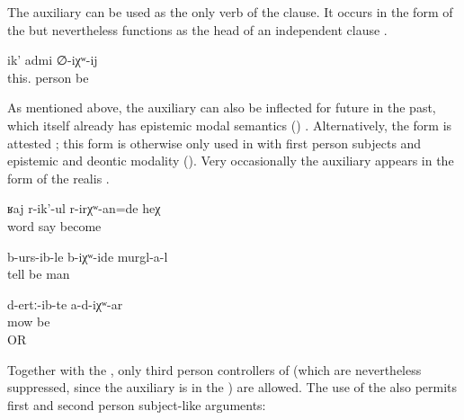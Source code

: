 The auxiliary can be used as the only verb of the clause. It occurs in the form of the  but nevertheless functions as the head of an independent clause .

\begin{exe}
	\ex	\label{ex:This is probably a man.}
	\gll	ik'	admi	∅-iχʷ-ij\\
		this.	person	be\\
	\glt	{}
\end{exe}

As mentioned above, the auxiliary can also be inflected for future in the past, which itself already has epistemic modal semantics () . Alternatively, the  form is attested ; this form is otherwise only used in  with first person subjects and epistemic and deontic modality (). Very occasionally the auxiliary appears in the form of the realis  .

\begin{exe}
	\ex	\label{ex:‎She must have been scolding / probably she was scolding}
	\gll	ʁaj	r-ik'-ul	r-irχʷ-an=de	heχ\\
		word	say	become	\\
	\glt	{}

	\ex	\label{ex:‎Probably the men had already told it}
	\gll	b-urs-ib-le	b-iχʷ-ide	murgl-a-l\\
		tell	be	man	\\
	\glt	{}

	\ex	\label{ex:‎‎This is probably mowed (grass).}
	\gll	d-ertː-ib-te	a-d-iχʷ-ar\\
		mow 	be\\
	\glt	{} OR 
\end{exe}

Together with the , only third person controllers of  (which are nevertheless suppressed, since the auxiliary is in the ) are allowed. The use of the  also permits first and second person subject-like arguments:

